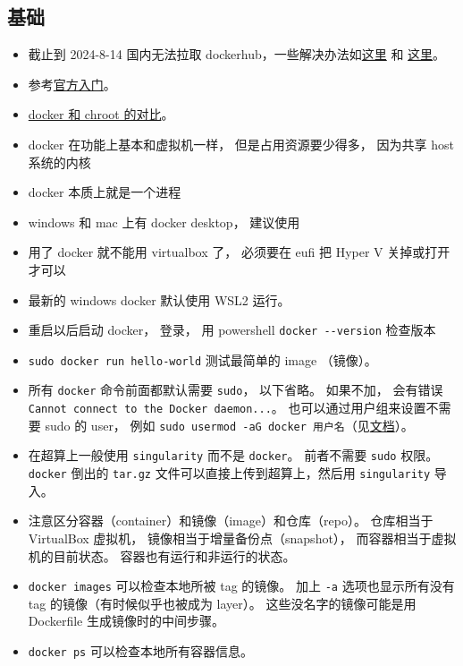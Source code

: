 \subsection{基础}
\begin{itemize}
\item 截止到 2024-8-14 国内无法拉取 dockerhub，一些解决办法如\href{https://cloud.tencent.com/developer/article/2434428}{这里} 和 \href{https://blog.csdn.net/btaworld/article/details/140437122}{这里}。
\item 参考\href{https://docs.docker.com/get-started/}{官方入门}。
\item \href{https://devops.stackexchange.com/questions/2826/difference-between-chroot-and-docker}{docker 和 chroot 的对比}。
\item docker 在功能上基本和虚拟机一样， 但是占用资源要少得多， 因为共享 host 系统的内核
\item docker 本质上就是一个进程
\item windows 和 mac 上有 docker desktop， 建议使用
\item 用了 docker 就不能用 virtualbox 了， 必须要在 eufi 把 Hyper V 关掉或打开才可以
\item 最新的 windows docker 默认使用 WSL2 运行。
\item 重启以后启动 docker， 登录， 用 powershell \verb`docker --version` 检查版本
\item \verb`sudo docker run hello-world` 测试最简单的 image （镜像）。
\item 所有 \verb`docker` 命令前面都默认需要 \verb`sudo`， 以下省略。 如果不加， 会有错误 \verb`Cannot connect to the Docker daemon...`。 也可以通过用户组来设置不需要 sudo 的 user， 例如 \verb`sudo usermod -aG docker 用户名`（见\href{https://docs.docker.com/engine/install/linux-postinstall/}{文档}）。
\item 在超算上一般使用 \verb`singularity` 而不是 \verb`docker`。 前者不需要 \verb`sudo` 权限。 \verb`docker` 倒出的 \verb`tar.gz` 文件可以直接上传到超算上，然后用 \verb`singularity` 导入。
\item 注意区分容器（container）和镜像（image）和仓库（repo）。 仓库相当于 VirtualBox 虚拟机， 镜像相当于增量备份点（snapshot）， 而容器相当于虚拟机的目前状态。 容器也有运行和非运行的状态。
\item \verb`docker images` 可以检查本地所被 tag 的镜像。 加上 \verb`-a` 选项也显示所有没有 tag 的镜像（有时候似乎也被成为 layer）。 这些没名字的镜像可能是用 Dockerfile 生成镜像时的中间步骤。
\item \verb`docker ps` 可以检查本地所有容器信息。

\end{itemize}
